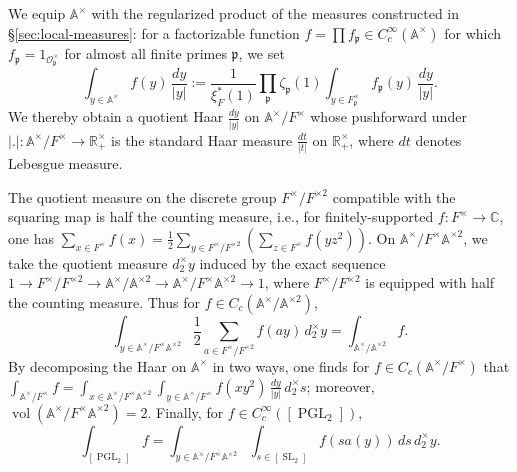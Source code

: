 \documentclass[reqno,10pt]{amsart}
\theoremstyle{plain} %
\theoremstyle{definition}
\theoremstyle{plain} %
\theoremstyle{remark}
\theoremstyle{itplain} %
\theoremstyle{remark} %
\numberwithin{equation}{section}
\DeclareMathOperator{\SL}{SL}
\def\PGL{\operatorname{PGL}}
\DeclareMathOperator{\vol}{vol}
\begin{document}
We equip $\mathbb{A}^\times$ with the regularized product of the measures constructed in \S\ref{sec:local-measures}: for a factorizable function $f = \prod f_\mathfrak{p} \in C_c^\infty(\mathbb{A}^\times)$ for which $f_\mathfrak{p} = 1_{\mathcal{O}_\mathfrak{p}^\times}$ for almost all finite primes $\mathfrak{p}$, we set
\[
  \int_{y \in \mathbb{A}^\times} f(y) \, \frac{d y}{|y|} := \frac{1}{\xi_F^*(1)} \prod_{\mathfrak{p}} \zeta_\mathfrak{p}(1) \int_{y \in F_\mathfrak{p}^\times} f_\mathfrak{p}(y) \, \frac{d y}{|y|}.
\]
We thereby obtain a quotient Haar $\frac{d y}{|y|}$ on $\mathbb{A}^\times / F^\times$ whose pushforward under $|.| : \mathbb{A}^\times / F^\times \rightarrow \mathbb{R}^\times_+$ is the standard Haar measure $\frac{d t}{|t|}$ on $\mathbb{R}^\times_+$, where $d t$ denotes Lebesgue measure.

The quotient measure on the discrete group $F^{\times } / F^{\times 2}$ compatible with the squaring map is half the counting measure, i.e., for finitely-supported $f : F^\times \rightarrow \mathbb{C}$, one has $\sum_{x \in F^\times } f(x) = \frac{1}{2} \sum_{y \in F^\times / F^{\times 2}} (\sum_{z \in F^\times} f(y z^2) )$.
On $\mathbb{A}^\times / F^\times \mathbb{A}^{\times 2}$, we take the quotient measure $d_2^\times y$ induced by the exact sequence $1 \rightarrow F^\times / F^{\times 2} \rightarrow \mathbb{A}^\times / \mathbb{A}^{\times 2} \rightarrow \mathbb{A}^\times / F^\times \mathbb{A}^{\times 2} \rightarrow 1$, where $F^{\times} / F^{\times 2}$ is equipped with half the counting measure.  Thus for $f \in C_c(\mathbb{A}^\times / \mathbb{A}^{\times 2})$,
\begin{equation}\label{eq:integral-formula-involving-squares}
  \int_{y \in \mathbb{A}^\times / F^\times \mathbb{A}^{\times  2}}
  \frac{1}{2} \sum_{a \in F^\times / F^{\times 2}}
  f(a y)
  \, d_2^\times y
  = \int_{\mathbb{A}^\times / \mathbb{A}^{\times 2}} f.
\end{equation}
By decomposing the Haar on $\mathbb{A}^\times$ in two ways, one finds for $f \in C_c(\mathbb{A}^\times / F^\times)$ that $\int_{\mathbb{A}^\times / F^\times} f = \int_{x \in \mathbb{A}^\times / F^{\times } \mathbb{A}^{\times 2}} \int_{y \in \mathbb{A}^\times / F^\times} f(x y^2) \, \frac{d y}{|y|} \, d_2^\times s$;
moreover, $\vol(\mathbb{A}^{\times} / F^\times \mathbb{A}^{\times 2}) = 2$.  Finally, for $f \in C_c^\infty([\PGL_2])$,
\begin{equation}\label{eq:sl2-vs-pgl2-integrals}
  \int_{[\PGL_2]} f
  =
  \int_{y \in \mathbb{A}^\times /  F^\times \mathbb{A}^{\times 2}}
  \int_{s \in [\SL_2]}
  f(s a(y)) \, d s \, d_2^\times y.
\end{equation}
\end{document}
